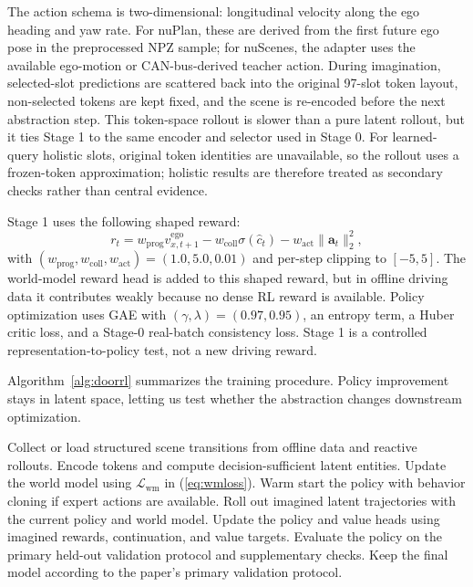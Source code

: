 \documentclass[10pt,journal,compsoc]{IEEEtran}
\newcommand{\method}{\textsc{DOOR}}
\begin{document}
The action schema is two-dimensional: longitudinal velocity along the ego heading and yaw rate. For nuPlan, these are derived from the first future ego pose in the preprocessed NPZ sample; for nuScenes, the adapter uses the available ego-motion or CAN-bus-derived teacher action. During imagination, selected-slot predictions are scattered back into the original 97-slot token layout, non-selected tokens are kept fixed, and the scene is re-encoded before the next abstraction step. This token-space rollout is slower than a pure latent rollout, but it ties Stage 1 to the same encoder and selector used in Stage 0. For learned-query holistic slots, original token identities are unavailable, so the rollout uses a frozen-token approximation; holistic results are therefore treated as secondary checks rather than central evidence.

Stage 1 uses the following shaped reward:
\begin{equation}
r_t =
w_{\mathrm{prog}} v^{\mathrm{ego}}_{x,t+1}
- w_{\mathrm{coll}}\sigma(\hat{c}_t)
- w_{\mathrm{act}}\|\mathbf{a}_t\|_2^2,
\label{eq:stagereward}
\end{equation}
with $(w_{\mathrm{prog}},w_{\mathrm{coll}},w_{\mathrm{act}})=(1.0,5.0,0.01)$ and per-step clipping to $[-5,5]$. The world-model reward head is added to this shaped reward, but in offline driving data it contributes weakly because no dense RL reward is available. Policy optimization uses GAE with $(\gamma,\lambda)=(0.97,0.95)$, an entropy term, a Huber critic loss, and a Stage-0 real-batch consistency loss. Stage 1 is a controlled representation-to-policy test, not a new driving reward.


Algorithm~\ref{alg:doorrl} summarizes the training procedure. Policy improvement stays in latent space, letting us test whether the abstraction changes downstream optimization.


\begin{algorithm}[!t]
\caption{\method\ Policy-Learning Procedure}
\label{alg:doorrl}
\begin{algorithmic}[1]
\STATE Collect or load structured scene transitions from offline data and reactive rollouts.
\STATE Encode tokens and compute decision-sufficient latent entities.
\STATE Update the world model using $\mathcal{L}_{\mathrm{wm}}$ in (\ref{eq:wmloss}).
\STATE Warm start the policy with behavior cloning if expert actions are available.
\STATE Roll out imagined latent trajectories with the current policy and world model.
\STATE Update the policy and value heads using imagined rewards, continuation, and value targets.
\STATE Evaluate the policy on the primary held-out validation protocol and supplementary checks.
\STATE Keep the final model according to the paper's primary validation protocol.
\end{algorithmic}
\end{algorithm}
\end{document}
